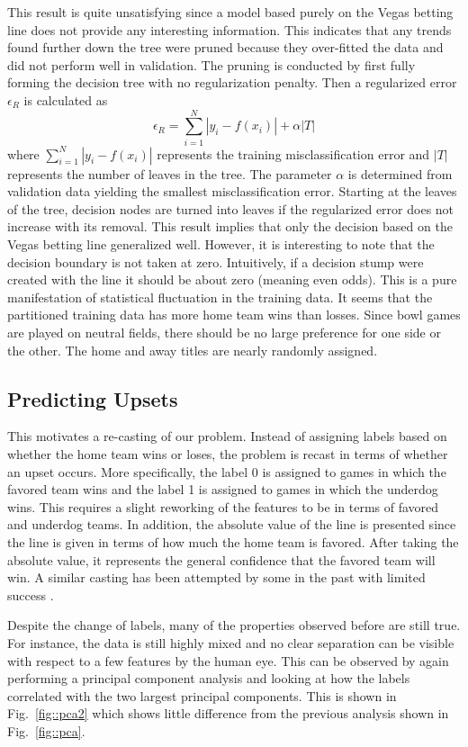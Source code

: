 \documentclass[12pt]{article}
\begin{document}
This result is quite unsatisfying since a model based purely on the Vegas betting line does not provide any interesting information. This indicates that any trends found further down the tree were pruned because they over-fitted the data and did not perform well in validation. The pruning is conducted by first fully forming the decision tree with no regularization penalty. Then a regularized error $\epsilon_R$ is calculated as
\begin{equation}
\epsilon_R = \sum_{i=1}^N |y_i - f(x_i)| + \alpha |T|
\end{equation}
where $\sum_{i=1}^N |y_i - f(x_i)|$ represents the training misclassification error and $|T|$ represents the number of leaves in the tree. The parameter $\alpha$ is determined from validation data yielding the smallest misclassification error. Starting at the leaves of the tree, decision nodes are turned into leaves if the regularized error does not increase with its removal. This result implies that only the decision based on the Vegas betting line generalized well. However, it is interesting to note that the decision boundary is not taken at zero. Intuitively, if a decision stump were created with the line it should be about zero (meaning even odds). This is a pure manifestation of statistical fluctuation in the training data. It seems that the partitioned training data has more home team wins than losses. Since bowl games are played on neutral fields, there should be no large preference for one side or the other. The home and away titles are nearly randomly assigned. 

\subsection{Predicting Upsets}
This motivates a re-casting of our problem. Instead of assigning labels based on whether the home team wins or loses, the problem is recast in terms of whether an upset occurs. More specifically, the label 0 is assigned to games in which the favored team wins and the label 1 is assigned to games in which the underdog wins. This requires a slight reworking of the features to be in terms of favored and underdog teams. In addition, the absolute value of the line is presented since the line is given in terms of how much the home team is favored. After taking the absolute value, it represents the general confidence that the favored team will win. A similar casting has been attempted by some in the past with limited success \cite{Padron}.

Despite the change of labels, many of the properties observed before are still true. For instance, the data is still highly mixed and no clear separation can be visible with respect to a few features by the human eye. This can be observed by again performing a principal component analysis and looking at how the labels correlated with the two largest principal components. This is shown in Fig.~\ref{fig::pca2} which shows little difference from the previous analysis shown in Fig.~\ref{fig::pca}.
\end{document}
